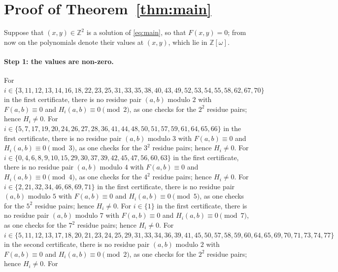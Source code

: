 \documentclass[11pt]{article}
\newcommand{\Z}{\mathbb{Z}}
\begin{document}
\section{Proof of Theorem~\ref{thm:main}}

Suppose that $(x,y)\in\Z^2$ is a solution of \eqref{eq:main}, so that $F(x,y)=0$; from now on the polynomials denote their values at $(x,y)$, which lie in $\Z[\omega]$.
\paragraph{Step 1: the values are non-zero.} For $i\in\{3,\allowbreak 11,\allowbreak 12,\allowbreak 13,\allowbreak 14,\allowbreak 16,\allowbreak 18,\allowbreak 22,\allowbreak 23,\allowbreak 25,\allowbreak 31,\allowbreak 33,\allowbreak 35,\allowbreak 38,\allowbreak 40,\allowbreak 43,\allowbreak 49,\allowbreak 52,\allowbreak 53,\allowbreak 54,\allowbreak 55,\allowbreak 58,\allowbreak 62,\allowbreak 67,\allowbreak 70\}$ in the first certificate, there is no residue pair $(a,b)$ modulo $2$ with $F(a,b)\equiv0$ and $H_i(a,b)\equiv0\pmod{2}$, as one checks for the $2^2$ residue pairs; hence $H_i\neq0$. For $i\in\{5,\allowbreak 7,\allowbreak 17,\allowbreak 19,\allowbreak 20,\allowbreak 24,\allowbreak 26,\allowbreak 27,\allowbreak 28,\allowbreak 36,\allowbreak 41,\allowbreak 44,\allowbreak 48,\allowbreak 50,\allowbreak 51,\allowbreak 57,\allowbreak 59,\allowbreak 61,\allowbreak 64,\allowbreak 65,\allowbreak 66\}$ in the first certificate, there is no residue pair $(a,b)$ modulo $3$ with $F(a,b)\equiv0$ and $H_i(a,b)\equiv0\pmod{3}$, as one checks for the $3^2$ residue pairs; hence $H_i\neq0$. For $i\in\{0,\allowbreak 4,\allowbreak 6,\allowbreak 8,\allowbreak 9,\allowbreak 10,\allowbreak 15,\allowbreak 29,\allowbreak 30,\allowbreak 37,\allowbreak 39,\allowbreak 42,\allowbreak 45,\allowbreak 47,\allowbreak 56,\allowbreak 60,\allowbreak 63\}$ in the first certificate, there is no residue pair $(a,b)$ modulo $4$ with $F(a,b)\equiv0$ and $H_i(a,b)\equiv0\pmod{4}$, as one checks for the $4^2$ residue pairs; hence $H_i\neq0$. For $i\in\{2,\allowbreak 21,\allowbreak 32,\allowbreak 34,\allowbreak 46,\allowbreak 68,\allowbreak 69,\allowbreak 71\}$ in the first certificate, there is no residue pair $(a,b)$ modulo $5$ with $F(a,b)\equiv0$ and $H_i(a,b)\equiv0\pmod{5}$, as one checks for the $5^2$ residue pairs; hence $H_i\neq0$. For $i\in\{1\}$ in the first certificate, there is no residue pair $(a,b)$ modulo $7$ with $F(a,b)\equiv0$ and $H_i(a,b)\equiv0\pmod{7}$, as one checks for the $7^2$ residue pairs; hence $H_i\neq0$. For $i\in\{5,\allowbreak 11,\allowbreak 12,\allowbreak 13,\allowbreak 17,\allowbreak 18,\allowbreak 20,\allowbreak 21,\allowbreak 23,\allowbreak 24,\allowbreak 25,\allowbreak 29,\allowbreak 31,\allowbreak 33,\allowbreak 34,\allowbreak 36,\allowbreak 39,\allowbreak 41,\allowbreak 45,\allowbreak 50,\allowbreak 57,\allowbreak 58,\allowbreak 59,\allowbreak 60,\allowbreak 64,\allowbreak 65,\allowbreak 69,\allowbreak 70,\allowbreak 71,\allowbreak 73,\allowbreak 74,\allowbreak 77\}$ in the second certificate, there is no residue pair $(a,b)$ modulo $2$ with $F(a,b)\equiv0$ and $H_i(a,b)\equiv0\pmod{2}$, as one checks for the $2^2$ residue pairs; hence $H_i\neq0$. For 
\end{document}
